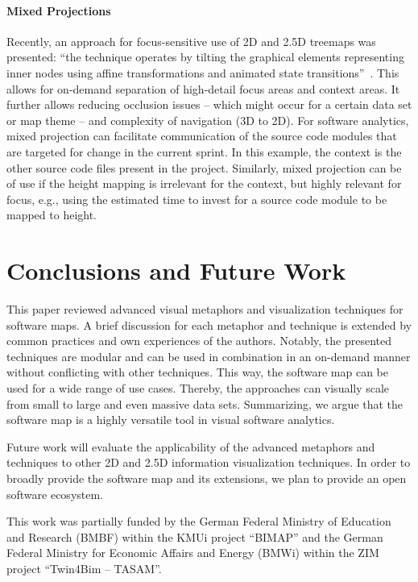 \documentclass[sigconf]{acmart}
\def\eg{e.g., }
\begin{document}
\paragraph{Mixed Projections}
Recently, an approach for focus-sensitive use of 2D and 2.5D treemaps was presented: 
\enquote{the technique operates by tilting the graphical elements representing inner nodes using affine transformations and animated state transitions}~\cite{limberger2017-mixed}.
This allows for on-demand separation of high-detail focus areas and context areas.
It further allows reducing occlusion issues -- which might occur for a certain data set or map theme -- and complexity of navigation (3D to 2D).
For software analytics, mixed projection can facilitate communication of the source code modules that are targeted for change in the current sprint.
In this example, the context is the other source code files present in the project.
Similarly, mixed projection can be of use if the height mapping is irrelevant for the context, but highly relevant for focus, \eg using the estimated time to invest for a source code module to be mapped to height.

\section{Conclusions and Future Work}
\par
This paper reviewed advanced visual metaphors and visualization techniques for software maps.
A brief discussion for each metaphor and technique is extended by common practices and own experiences of the authors.
Notably, the presented techniques are modular and can be used in combination in an on-demand manner without conflicting with other techniques.
This way, the software map can be used for a wide range of use cases.
Thereby, the approaches can visually scale from small to large and even massive data sets.
Summarizing, we argue that the software map is a highly versatile tool in visual software analytics.
\par
Future work will evaluate the applicability of the advanced metaphors and techniques to other 2D and 2.5D information visualization techniques.
In order to broadly provide the software map and its extensions, we plan to provide an open software ecosystem.

\begin{acks}
	This work was partially funded by the German Federal Ministry of Education and Research (BMBF) within the KMUi project \enquote{BIMAP} and the German Federal Ministry for Economic Affairs and Energy (BMWi) within the ZIM project \enquote{{Twin4Bim -- TASAM}}.
\end{acks}


\balance

\end{document}
